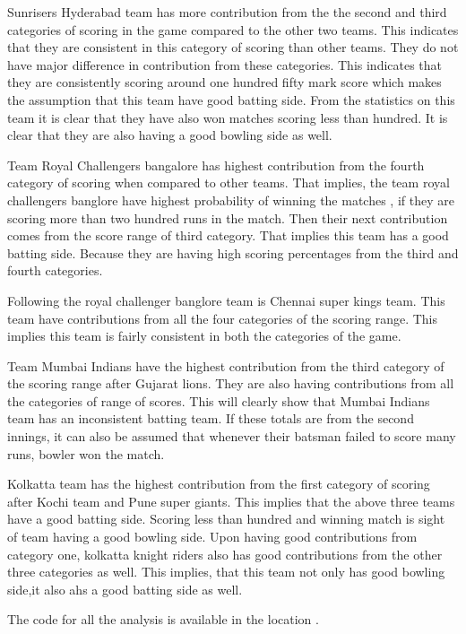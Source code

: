 \documentclass[sigconf]{acmart}
\begin{document}
Sunrisers Hyderabad team has more contribution from the the second and third categories of scoring in the game compared to the other two teams. This indicates that they are consistent in this category of scoring than other teams. They do not have major difference in contribution from these categories. This indicates that they are consistently scoring around one hundred fifty mark score which makes the assumption that this team have good batting side. From the statistics on this team it is clear that they have also won matches scoring less than hundred. It is clear that they are also having a good bowling side as well. 

Team Royal Challengers bangalore has highest contribution from the fourth category of scoring when compared to other teams. That implies, the team royal challengers banglore have highest probability of winning the matches , if they are scoring more than two hundred runs in the match. Then their next contribution comes from the score range of third category. That implies this team has a good batting side. Because they are having high scoring percentages from the third and fourth categories. 

Following the royal challenger banglore team is Chennai super kings team. This team have contributions from all the four categories of the scoring range. This implies this team is fairly consistent in both the categories of the game. 

Team Mumbai Indians have the highest contribution from the third category of the scoring range after Gujarat lions. They are also having contributions from all the categories of range of scores. This will clearly show that Mumbai Indians team has an inconsistent batting team. If these totals are from the second innings, it can also be assumed that whenever their batsman failed to score many runs, bowler won the match. 

Kolkatta team has the highest contribution from the first category of scoring after Kochi team and Pune super giants. This implies that the above three teams have a good batting side. Scoring less than hundred and winning match is sight of team having a good bowling side. Upon having good contributions from category one, kolkatta knight riders also has good contributions from the other three categories as well. This implies, that this team not only has good bowling side,it also ahs a good batting side as well.

The code for all the analysis is available in the location \cite{code} .
\end{document}
